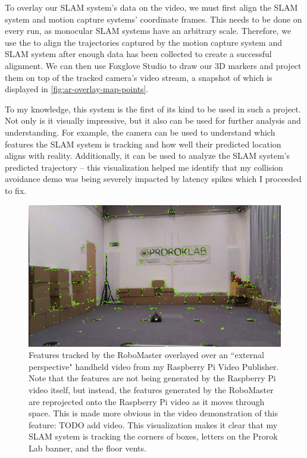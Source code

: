 To overlay our SLAM system's data on the video, we must first align the SLAM system and motion capture systems' coordinate frames. This needs to be done on every run, as monocular SLAM systems have an arbitrary scale. Therefore, we use the  to align the trajectories captured by the motion capture system and SLAM system after enough data has been collected to create a successful alignment. We can then use Foxglove Studio to draw our 3D markers and project them on top of the tracked camera's video stream, a snapshot of which is displayed in \autoref{fig:ar-overlay-map-points}.

To my knowledge, this system is the first of its kind to be used in such a project. Not only is it visually impressive, but it also can be used for further analysis and understanding. For example, the camera can be used to understand which features the SLAM system is tracking and how well their predicted location aligns with reality. Additionally, it can be used to analyze the SLAM system's predicted trajectory – this visualization helped me identify that my collision avoidance demo was being severely impacted by latency spikes which I proceeded to fix.

\begin{figure}[h]
    \centering
    \includegraphics[width=0.8\linewidth]{figures/ar_overlay_map_points.png}

    \caption{Features tracked by the RoboMaster overlayed over an ``external perspective" handheld video from my Raspberry Pi Video Publisher. Note that the features are not being generated by the Raspberry Pi video itself, but instead, the features generated by the RoboMaster are reprojected onto the Raspberry Pi video as it moves through space. This is made more obvious in the video demonstration of this feature: TODO add video. \captionbreak This visualization makes it clear that my SLAM system is tracking the corners of boxes, letters on the Prorok Lab banner, and the floor vents.}
    \label{fig:ar-overlay-map-points}
\end{figure}

